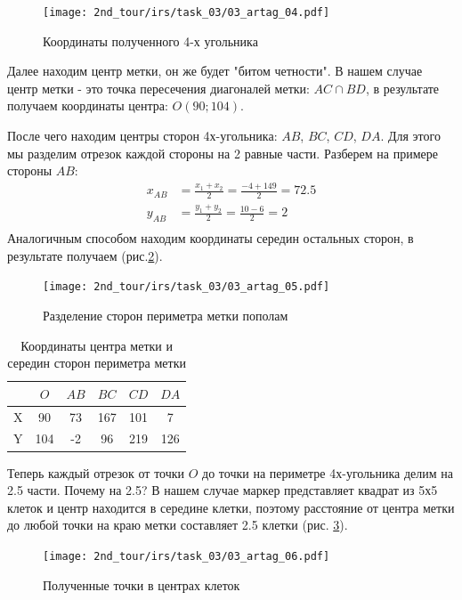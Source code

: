 \begin{figure}[h!]
	\centering
	\texttt{[image: 2nd\_tour/irs/task\_03/03\_artag\_04.pdf]}
	\caption{Координаты полученного 4-х угольника}
	\label{fig:03_artag_04}
\end{figure}

Далее находим центр метки, он же будет "битом четности". В нашем случае центр метки - это точка пересечения диагоналей метки: $AC \cap BD$, в результате получаем координаты центра: $O(90; 104)$.

После чего находим центры сторон 4х-угольника: $AB$, $BC$, $CD$, $DA$. Для этого мы разделим отрезок каждой стороны на 2 равные части. Разберем на примере стороны $AB$:
\begin{equation*}
\begin{aligned}
x_{AB} & = \frac{x_1 + x_2}{2} = \frac{-4 + 149}{2} = 72.5 \\
y_{AB} & = \frac{y_1 + y_2}{2} = \frac{10 - 6}{2} = 2 \\		
\end{aligned}
\end{equation*}
Аналогичным способом находим координаты середин остальных сторон, в результате получаем (рис.\ref{fig:03_artag_05}).
\begin{figure}[h!]
	\centering
	\texttt{[image: 2nd\_tour/irs/task\_03/03\_artag\_05.pdf]}
	\caption{Разделение сторон периметра метки пополам}
	\label{fig:03_artag_05}
\end{figure}

\begin{table}[h!]
	\begin{center}
		\begin{tabular}{|c|c|c|c|c|c|}
			\hline 
			& $O$ & $AB$ & $BC$ & $CD$ & $DA$\\
			\hline 
			X & 90 & 73 & 167 & 101 & 7 \\ 
			\hline 
			Y & 104 & -2 & 96 & 219 & 126 \\
			\hline 
		\end{tabular} 
		\caption{Координаты центра метки и середин сторон периметра метки}
	\end{center}
\end{table}

Теперь каждый отрезок от точки $O$ до точки на периметре 4х-угольника делим на 2.5 части. Почему на 2.5? В нашем случае маркер представляет квадрат из 5х5 клеток и центр находится в середине клетки, поэтому расстояние от центра метки до любой точки на краю метки составляет 2.5 клетки (рис. \ref{fig:03_artag_06}).
\\
\begin{figure}[h!]
	\centering
	\texttt{[image: 2nd\_tour/irs/task\_03/03\_artag\_06.pdf]}
	\caption{Полученные точки в центрах клеток}
	\label{fig:03_artag_06}
\end{figure}


